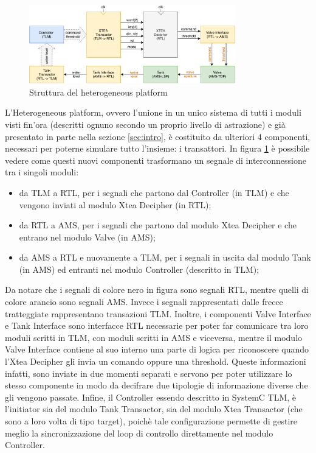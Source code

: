 \documentclass[]{IEEEtran}
\begin{document}
\begin{figure}[b]
    \centering
    \includegraphics[width=0.8\textwidth]{figures/heterogeneous.pdf}
    \caption{Struttura del heterogeneous platform}
    \label{fig:heterogeneous}
\end{figure}

L'Heterogeneous platform, ovvero l'unione in un unico sistema di tutti i moduli visti fin'ora (descritti ognuno secondo 
un proprio livello di astrazione) e gi\`a presentato in parte nella sezione \ref{sec:intro}, \`e costituito da ulteriori 
4 componenti, necessari per poterne simulare tutto l'insieme: i transattori. 
In figura \ref{fig:heterogeneous} \`e possibile vedere come questi nuovi componenti trasformano un segnale di 
interconnessione tra i singoli moduli:
\begin{itemize}
    \item da TLM a RTL, per i segnali che partono dal Controller (in TLM) e che vengono 
    inviati al modulo Xtea Decipher (in RTL);
    \item da RTL a AMS, per i segnali che partono dal modulo Xtea Decipher e che entrano nel 
    modulo Valve (in AMS);
    \item da AMS a RTL e nuovamente a TLM, per i segnali in uscita dal modulo Tank (in AMS) ed entranti nel modulo 
    Controller (descritto in TLM);
\end{itemize}
Da notare che i segnali di colore nero in figura sono segnali RTL, mentre quelli di colore arancio sono segnali AMS. 
Invece i segnali rappresentati dalle frecce tratteggiate rappresentano transazioni TLM.
Inoltre, i componenti Valve Interface e Tank Interface sono interfacce RTL necessarie per poter 
far comunicare tra loro moduli scritti in TLM, con moduli scritti in AMS e viceversa, mentre il modulo Valve Interface 
contiene al suo interno una parte di logica per riconoscere quando l'Xtea Decipher gli invia un comando oppure una 
threshold. Queste informazioni infatti, sono inviate in due momenti separati e servono per poter utilizzare lo stesso 
componente in modo da decifrare due tipologie di informazione diverse che gli vengono passate.
Infine, il Controller essendo descritto in SystemC TLM, \`e l'initiator sia del modulo Tank Transactor, sia del modulo 
Xtea Transactor (che sono a loro volta di tipo target), poich\`e tale configurazione permette di gestire meglio la 
sincronizzazione del loop di controllo direttamente nel modulo Controller.
\end{document}
